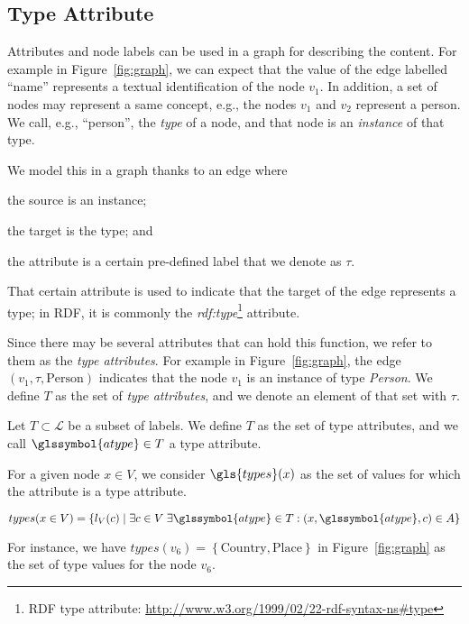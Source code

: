 \subsection{Type Attribute}
\label{sec:ssd:type}

Attributes and node labels can be used in a graph for describing the content. For example in Figure~\ref{fig:graph}, we can expect that the value of the edge labelled ``name'' represents a textual identification of the node $v_1$. In addition, a set of nodes may represent a same concept, e.g., the nodes $v_1$ and $v_2$ represent a person. We call, e.g., ``person'', the \emph{type} of a node, and that node is an \emph{instance} of that type.

We model this in a graph thanks to an edge where
\begin{inparaenum}[(1)]
\item the source is an instance;
\item the target is the type; and
\item the attribute is a certain pre-defined label that we denote as $\tau$.
\end{inparaenum}
That certain attribute is used to indicate that the target of the edge represents a type; in RDF, it is commonly the \emph{rdf:type}\footnote{RDF type attribute: \url{http://www.w3.org/1999/02/22-rdf-syntax-ns\#type}} attribute.

Since there may be several attributes that can hold this function, we refer to them as the \emph{type attributes}. For example in Figure~\ref{fig:graph}, the edge $(v_1, \tau, \text{Person})$ indicates that the node $v_1$ is an instance of type \emph{Person}.
We define $T$ as the set of \emph{type attributes}, and we denote an element of that set with $\tau$.%

\begin{definition}
Let $T \subset \mathcal{L}$ be a subset of labels.
We define $T$ as the set of type attributes, and we call $\glssymbol{atype} \in T$ a type attribute.
\end{definition}

For a given node $x \in V$, we consider $\gls{types}(x)$ as the set of values for which the attribute is a type attribute.

$$
types(x\in V) = \left\lbrace l_V(c) \mid \exists c \in V\; \exists \glssymbol{atype} \in T: (x, \glssymbol{atype}, c) \in A \right\rbrace
$$

For instance, we have $types\left(v_6\right) = \left\{ \text{Country}, \text{Place} \right\}$ in Figure~\ref{fig:graph} as the set of type values for the node $v_6$.

